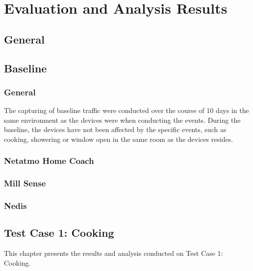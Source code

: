 \chapter{Evaluation and Analysis Results}
\section{General}

\section{Baseline}
\subsection{General}
The capturing of baseline traffic were conducted over the course of 10 days in the same environment as the devices were when conducting the events. During the baseline, the devices have not been affected by the specific events, such as cooking, showering or window open in the same room as the devices resides. 
\subsection{Netatmo Home Coach}
\subsection{Mill Sense}
\subsection{Nedis}

\section{Test Case 1: Cooking}
This chapter presents the results and analysis conducted on Test Case 1: Cooking.
